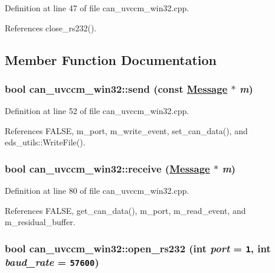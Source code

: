Definition at line 47 of file can\_\-uvccm\_\-win32.cpp.

References close\_\-rs232().

\subsection{Member Function Documentation}
\hypertarget{classcan__uvccm__win32_3358bfa32c0164bc11d220745e3e0430}{
\subsubsection[send]{\setlength{\rightskip}{0pt plus 5cm}bool can\_\-uvccm\_\-win32::send (const \hyperlink{structMessage}{Message} $\ast$ {\em m})}}
\label{classcan__uvccm__win32_3358bfa32c0164bc11d220745e3e0430}




Definition at line 52 of file can\_\-uvccm\_\-win32.cpp.

References FALSE, m\_\-port, m\_\-write\_\-event, set\_\-can\_\-data(), and eds\_\-utils::Write\-File().\hypertarget{classcan__uvccm__win32_4301393c1d3046b35d0b545e761b94db}{
\subsubsection[receive]{\setlength{\rightskip}{0pt plus 5cm}bool can\_\-uvccm\_\-win32::receive (\hyperlink{structMessage}{Message} $\ast$ {\em m})}}
\label{classcan__uvccm__win32_4301393c1d3046b35d0b545e761b94db}




Definition at line 80 of file can\_\-uvccm\_\-win32.cpp.

References FALSE, get\_\-can\_\-data(), m\_\-port, m\_\-read\_\-event, and m\_\-residual\_\-buffer.\hypertarget{classcan__uvccm__win32_7fb6732edc691451bc1d3206c07d4715}{
\subsubsection[open\_\-rs232]{\setlength{\rightskip}{0pt plus 5cm}bool can\_\-uvccm\_\-win32::open\_\-rs232 (int {\em port} = {\tt 1}, int {\em baud\_\-rate} = {\tt 57600})}}
\label{classcan__uvccm__win32_7fb6732edc691451bc1d3206c07d4715}




